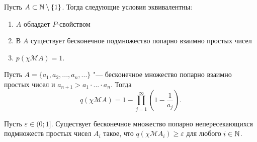	Пусть $A\subset \mathbb{N}\setminus\{1\}$.
	Тогда следующие условия эквивалентны:
	\begin{enumerate}[label=(\roman*)]
		\item
			$A$ обладает $P$-свойством
		\item
			В $A$ существует бесконечное подмножество попарно взаимно простых чисел
		\item
			$p(\chi\mathscr{M}A)=1$.
	\end{enumerate}

	Пусть $A = \{a_1, a_2, ..., a_n,...\}$ "--- бесконечное множество попарно взаимно простых чисел
	и $a_{n+1}>a_1\cdot...\cdot a_n$.
	Тогда
	\begin{equation}
		q(\chi\mathscr{M}A) = 1-\prod_{j=1}^\infty \left(1-\frac{1}{a_j}\right)
		.
	\end{equation}

	Пусть $\varepsilon \in  (0; 1{]}$.
	Существует бесконечное множество попарно непересекающихся подмножеств простых чисел
	$A_i$ такое, что $q(\chi\mathscr{M}A_i)\geq\varepsilon$ для любого $i\in\mathbb{N}$.

